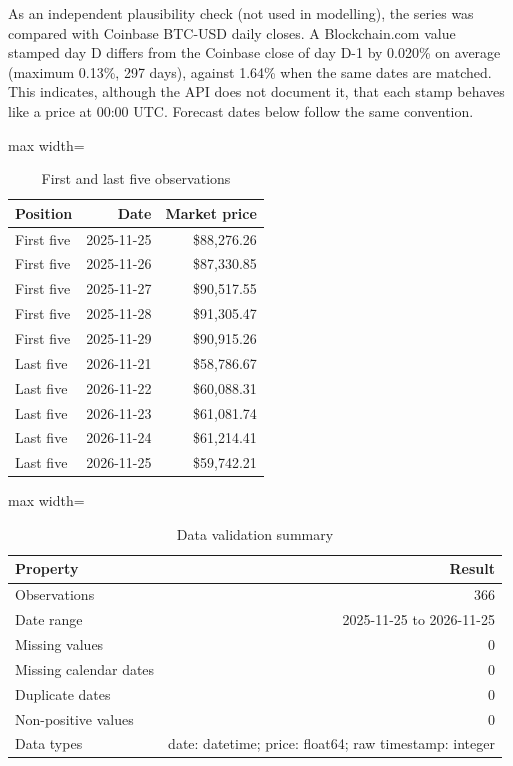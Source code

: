 \documentclass[11pt,a4paper]{article}
\begin{document}
As an independent plausibility check (not used in modelling), the series was compared with Coinbase BTC-USD daily closes. A Blockchain.com value stamped day D differs from the Coinbase close of day D-1 by 0.020\% on average (maximum 0.13\%, 297 days), against 1.64\% when the same dates are matched. This indicates, although the API does not document it, that each stamp behaves like a price at 00:00 UTC. Forecast dates below follow the same convention.

\begin{table}[H]
\centering
\caption{First and last five observations}
\small
\setlength{\tabcolsep}{4pt}
\begin{adjustbox}{max width=\linewidth}
\begin{tabular}{lrr}
\toprule
\textbf{Position} & \textbf{Date} & \textbf{Market price} \\
\midrule
First five & 2025-11-25 & \$88,276.26 \\
First five & 2025-11-26 & \$87,330.85 \\
First five & 2025-11-27 & \$90,517.55 \\
First five & 2025-11-28 & \$91,305.47 \\
First five & 2025-11-29 & \$90,915.26 \\
Last five & 2026-11-21 & \$58,786.67 \\
Last five & 2026-11-22 & \$60,088.31 \\
Last five & 2026-11-23 & \$61,081.74 \\
Last five & 2026-11-24 & \$61,214.41 \\
Last five & 2026-11-25 & \$59,742.21 \\
\bottomrule
\end{tabular}
\end{adjustbox}
\end{table}

\begin{table}[H]
\centering
\caption{Data validation summary}
\small
\setlength{\tabcolsep}{4pt}
\begin{adjustbox}{max width=\linewidth}
\begin{tabular}{lr}
\toprule
\textbf{Property} & \textbf{Result} \\
\midrule
Observations & 366 \\
Date range & 2025-11-25 to 2026-11-25 \\
Missing values & 0 \\
Missing calendar dates & 0 \\
Duplicate dates & 0 \\
Non-positive values & 0 \\
Data types & date: datetime; price: float64; raw timestamp: integer \\
\bottomrule
\end{tabular}
\end{adjustbox}
\end{table}
\end{document}

